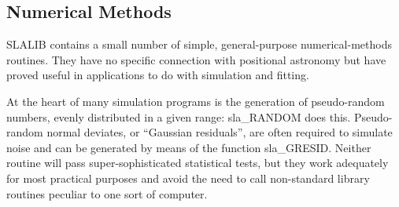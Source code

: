 \documentclass[11pt,twoside]{article}
\begin{document}
\subsection{Numerical Methods}
SLALIB contains a small number of simple, general-purpose
numerical-methods routines.  They have no specific
connection with positional astronomy but have proved useful in
applications to do with simulation and fitting.

At the heart of many simulation programs is the generation of
pseudo-random numbers, evenly distributed in a given range:
sla\_RANDOM
does this.  Pseudo-random normal deviates, or ``Gaussian
residuals'', are often required to simulate noise and
can be generated by means of the function
sla\_GRESID.
Neither routine will pass super-sophisticated
statistical tests, but they work adequately for most
practical purposes and avoid the need to call non-standard
library routines peculiar to one sort of computer.
\end{document}
